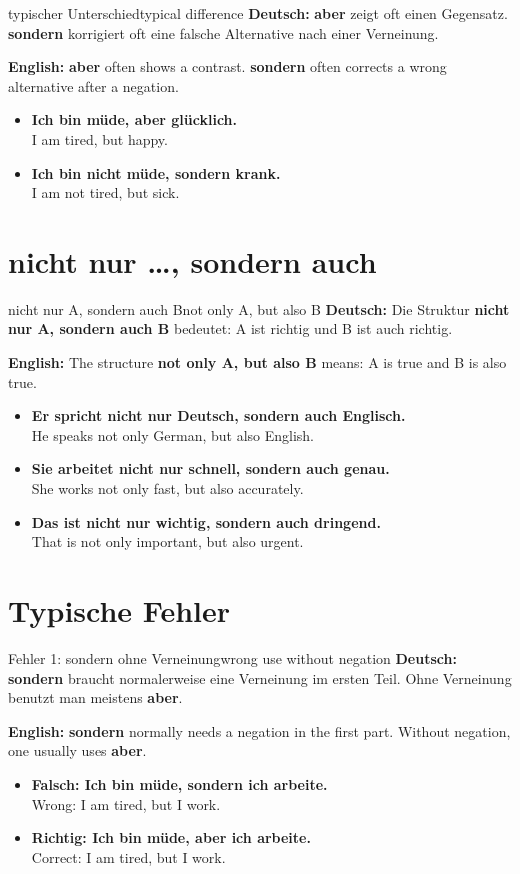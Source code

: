 \documentclass[a4paper,11pt]{article}
\newcommand{\GermanText}[1]{\textbf{Deutsch: }#1\par}
\newcommand{\EnglishText}[1]{{\small\color{SoftGray}\textbf{English: }#1\par}}
\newcommand{\ExampleItem}[2]{\item \textbf{#1}\\{\small\color{SoftGray}#2}}
\begin{document}
\begin{grammarentry}{typischer Unterschied}{typical difference}
\GermanText{\textbf{aber} zeigt oft einen Gegensatz. \textbf{sondern} korrigiert oft eine falsche Alternative nach einer Verneinung.}
\EnglishText{\textbf{aber} often shows a contrast. \textbf{sondern} often corrects a wrong alternative after a negation.}

\begin{exbox}
\begin{itemize}
    \ExampleItem{Ich bin müde, aber glücklich.}{I am tired, but happy.}
    \ExampleItem{Ich bin nicht müde, sondern krank.}{I am not tired, but sick.}
\end{itemize}
\end{exbox}
\end{grammarentry}

\section{nicht nur \ldots{}, sondern auch}

\begin{grammarentry}{nicht nur A, sondern auch B}{not only A, but also B}
\GermanText{Die Struktur \textbf{nicht nur A, sondern auch B} bedeutet: A ist richtig und B ist auch richtig.}
\EnglishText{The structure \textbf{not only A, but also B} means: A is true and B is also true.}

\begin{exbox}
\begin{itemize}
    \ExampleItem{Er spricht nicht nur Deutsch, sondern auch Englisch.}{He speaks not only German, but also English.}
    \ExampleItem{Sie arbeitet nicht nur schnell, sondern auch genau.}{She works not only fast, but also accurately.}
    \ExampleItem{Das ist nicht nur wichtig, sondern auch dringend.}{That is not only important, but also urgent.}
\end{itemize}
\end{exbox}
\end{grammarentry}

\section{Typische Fehler}

\begin{grammarentry}{Fehler 1: sondern ohne Verneinung}{wrong use without negation}
\GermanText{\textbf{sondern} braucht normalerweise eine Verneinung im ersten Teil. Ohne Verneinung benutzt man meistens \textbf{aber}.}
\EnglishText{\textbf{sondern} normally needs a negation in the first part. Without negation, one usually uses \textbf{aber}.}

\begin{exbox}
\begin{itemize}
    \ExampleItem{Falsch: Ich bin müde, sondern ich arbeite.}{Wrong: I am tired, but I work.}
    \ExampleItem{Richtig: Ich bin müde, aber ich arbeite.}{Correct: I am tired, but I work.}
\end{itemize}
\end{exbox}
\end{grammarentry}
\end{document}
